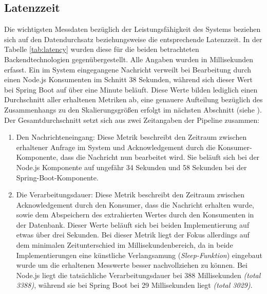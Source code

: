\subsection{Latenzzeit}
Die wichtigsten Messdaten bezüglich der Leistungsfähigkeit des Systems beziehen sich auf den Datendurchsatz beziehungsweise die entsprechende Latenzzeit. In der Tabelle \ref{tab:latency} wurden diese für die beiden betrachteten Backendtechnologien gegenübergestellt. Alle Angaben wurden in Millisekunden erfasst. Ein im System eingegangene Nachricht verweilt bei Bearbeitung durch einen Node.js Konsumenten im Schnitt 38 Sekunden, während sich dieser Wert bei Spring Boot auf über eine Minute beläuft. Diese Werte bilden lediglich einen Durchschnitt aller erhaltenen Metriken ab, eine genauere Aufteilung bezüglich des Zusammenhangs zu den Skalierungsgrößen erfolgt im nächsten Abschnitt (siehe ). Der Gesamtdurchschnitt setzt sich aus zwei Zeitangaben der Pipeline zusammen: 

\begin{enumerate}
  \item Den Nachrichteneingang: Diese Metrik beschreibt den Zeitraum zwischen erhaltener Anfrage im System und Acknowledgement durch die Konsumer-Komponente, dass die Nachricht nun bearbeitet wird. Sie beläuft sich bei der Node.js Komponente auf ungefähr 34 Sekunden und 58 Sekunden bei der Spring-Boot-Komponente. 
  \item Die Verarbeitungsdauer: Diese Metrik beschreibt den Zeitraum zwischen Acknowledgement durch den Konsumer, dass die Nachricht erhalten wurde, sowie dem Abspeichern des extrahierten Wertes durch den Konsumenten in der Datenbank. Dieser Werte beläuft sich bei beiden Implementierung auf etwas über drei Sekunden. Bei dieser Metrik liegt der Fokus allerdings auf dem minimalen Zeitunterschied im Millisekundenbereich, da in beide Implementierungen eine künstliche Verlangsamung (\emph{Sleep-Funktion}) eingebaut wurde um die erhaltenen Messwerte besser nachvollziehen zu können. Bei Node.js liegt die tatsächliche Verarbeitungsdauer bei 388 Millisekunden \emph{(total 3388)}, während sie bei Spring Boot bei 29 Millisekunden liegt \emph{(total 3029)}.
\end{enumerate}

